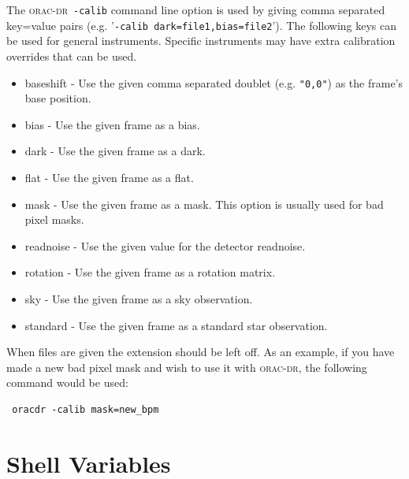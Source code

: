 \documentclass[twoside,11pt]{article}
\newcommand{\xlabel}[1]{}
\renewcommand{\_}{\texttt{\symbol{95}}}
\newcommand{\oracdr}{\textsc{orac-dr}}
\begin{document}
The \oracdr\ \texttt{-calib} command line option is used by giving comma
separated key=value pairs (e.g. '\texttt{-calib dark=file1,bias=file2}').
The following keys can be used for general instruments. Specific
instruments may have extra calibration overrides that can be used.

\begin{itemize}
\item 

baseshift - Use the given comma separated doublet (e.g. \texttt{"0,0"})
as the frame's base position.

\item 

bias - Use the given frame as a bias.

\item 

dark - Use the given frame as a dark.

\item 

flat - Use the given frame as a flat.

\item 

mask - Use the given frame as a mask. This option is usually used
for bad pixel masks.

\item 

readnoise - Use the given value for the detector readnoise.

\item 

rotation - Use the given frame as a rotation matrix.

\item 

sky - Use the given frame as a sky observation.

\item 

standard - Use the given frame as a standard star observation.

\end{itemize}


When files are given the extension should be left off. As an example,
if you have made a new bad pixel mask and wish to use it with \oracdr,
the following command would be used:

\begin{verbatim}
 oracdr -calib mask=new_bpm
\end{verbatim}

\section{Shell Variables\label{Shell_Variables}\xlabel{shell_variables}}
\end{document}
